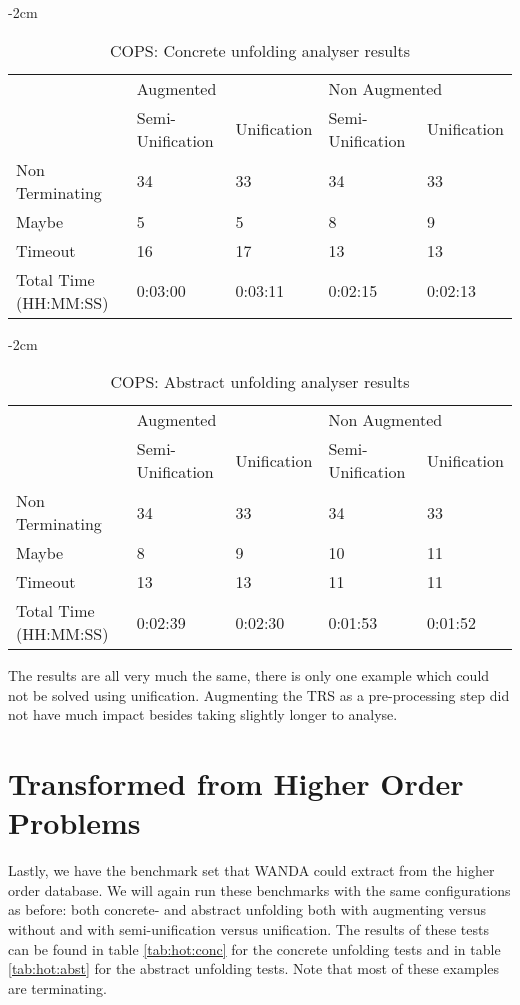 \begin{table}[ht]
    \centering
    \addtolength{\leftskip} {-2cm}
    \addtolength{\rightskip}{-2cm}

    \begin{tabular}{|l|l|l|l|l|}
    \cline{2-5} 
    \multicolumn{1}{c|}{} & \multicolumn{2}{l|}{Augmented} & \multicolumn{2}{l|}{Non Augmented} \\ \cline{2-5} 
    \multicolumn{1}{c|}{} & Semi-Unification & Unification & Semi-Unification & Unification \\ \hline
    Non Terminating & 34 & 33 & 34 & 33 \\ \hline
    Maybe & 5 & 5 & 8 & 9\\ \hline
    Timeout & 16 & 17 & 13 & 13 \\ \hline
    Total Time (HH:MM:SS) & 0:03:00 & 0:03:11 & 0:02:15 & 0:02:13 \\ \hline
    \end{tabular}
    \caption{COPS: Concrete unfolding analyser results}
\label{tab:cops:conc}

\end{table}
\begin{table}[ht]
    \centering
    \addtolength{\leftskip} {-2cm}
    \addtolength{\rightskip}{-2cm}

    \begin{tabular}{|l|l|l|l|l|}
    \cline{2-5} 
    \multicolumn{1}{c|}{} & \multicolumn{2}{l|}{Augmented} & \multicolumn{2}{l|}{Non Augmented} \\ \cline{2-5} 
    \multicolumn{1}{c|}{} & Semi-Unification & Unification & Semi-Unification & Unification \\ \hline
    Non Terminating & 34 & 33 & 34 & 33 \\ \hline
    Maybe & 8 & 9 & 10 & 11 \\ \hline
    Timeout & 13 & 13 & 11 & 11 \\ \hline
    Total Time (HH:MM:SS) & 0:02:39 & 0:02:30 & 0:01:53 & 0:01:52 \\ \hline
    \end{tabular}
    \caption{COPS: Abstract unfolding analyser results}
    \label{tab:cops:abst}
\end{table}

The results are all very much the same, there is only one example which could not be solved using unification. Augmenting the TRS as a pre-processing step did not have much impact besides taking slightly longer to analyse. 

\section{Transformed from Higher Order Problems}
Lastly, we have the benchmark set that WANDA\cite{KOP:WANDASITE} could extract from the higher order database. We will again run these benchmarks with the same configurations as before: both concrete- and abstract unfolding both with augmenting versus without and with semi-unification versus unification. The results of these tests can be found in table \ref{tab:hot:conc} for the concrete unfolding tests and in table \ref{tab:hot:abst} for the abstract unfolding tests. Note that most of these examples are terminating. 

